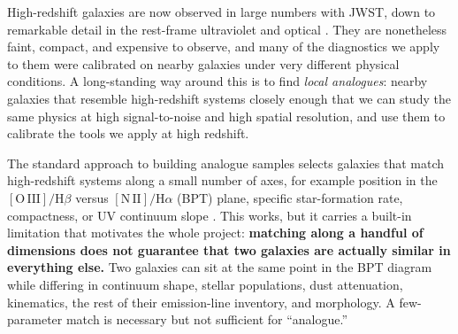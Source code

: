 \documentclass[onecolumn,astrosymb,tighten,longbib,trackchanges]{aastex7} %
\begin{document}
High-redshift galaxies are now observed in large numbers with JWST, down to remarkable detail in
the rest-frame ultraviolet and optical \citep[e.g.][]{Hayes2025_highz_UV}. They are nonetheless
faint, compact, and expensive to observe, and many of the diagnostics we apply to them were
calibrated on nearby galaxies under very different physical conditions. A long-standing way around
this is to find \emph{local analogues}: nearby galaxies that resemble high-redshift systems closely
enough that we can study the same physics at high signal-to-noise and high spatial resolution, and
use them to calibrate the tools we apply at high redshift.

The standard approach to building analogue samples selects galaxies that match high-redshift
systems along a small number of axes, for example position in the
$[\mathrm{O\,III}]/\mathrm{H}\beta$ versus $[\mathrm{N\,II}]/\mathrm{H}\alpha$ (BPT) plane, specific
star-formation rate, compactness, or UV continuum slope \citep{Bian2016_local_analogues}. This
works, but it carries a built-in limitation that motivates the whole project: \textbf{matching
along a handful of dimensions does not guarantee that two galaxies are actually similar in
everything else.} Two galaxies can sit at the same point in the BPT diagram while differing in
continuum shape, stellar populations, dust attenuation, kinematics, the rest of their emission-line
inventory, and morphology. A few-parameter match is necessary but not sufficient for ``analogue.''
\end{document}
